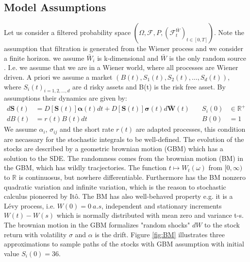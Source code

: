 \subsection{Model Assumptions}
Let us consider a filtered probability space $(\Omega, \mathcal{F}, P, (\mathcal{F}_t^{\bar{W}})_{t \in [0,T]})$. Note the assumption that filtration is generated from the Wiener process and we consider a finite horizon. we assume $\bar{W}_i$ is k-dimensional and $\bar{W}$ is the only random source . I.e. we assume that we are in a Wiener world, where all processes are Wiener driven. A priori we assume a market $(B(t),S_1(t), S_2(t),\ldots, S_d(t))$, where ${S_i(t)}_{i=1,2,\ldots,d}$ are d risky assets and B(t) is the risk free asset. By assumptions their dynamics are given by:\\
\begin{align}
d\bm{S}(t)&=D[\bm{S}(t)]\bm{\alpha}(t)dt+D[\bm{S}(t)]\bm{\sigma}(t)d\bar{\bm{W}}(t) \quad & S_i(0) &\in \mathbb{R}^+ \label{GBM-P} \\
dB(t)&=r(t)B(t)dt \quad & B(0) &= 1
\end{align}
We assume $\alpha_i$, $\sigma_{ij}$ and the short rate $r(t)$ are adapted processes, this condition are necassary for the stochastic integrals to be well-defined. The evolution of the stocks are described by a geometric brownian motion (GBM) which has a solution to the SDE. The randomness comes from the brownian motion (BM) in the GBM, which has wildly tracjectories. The function $t\mapsto W_{t}(\omega)$ from $[0,\infty)$ to $\mathbb{R}$ is continuosus, but nowhere differentiable. Furthermore has the BM nonzero quadratic variation and infinite variation, which is the reason to stochastic calculus pioneered by Itô. The BM has also well-behaved property e.g. it is a Lévy process, i.e. $W(0)=0 \ a.s$, independent and stationary increments $W(t)-W(s)$ which is normally distributed with mean zero and variance t-s. The brownian motion in the GBM formalizes "random shocks" $dW$ to the stock return with volatility $\sigma$ and $\alpha$ is the drift. Figure \ref{fig:BM} illustrates three approximations to sample paths of the stocks with GBM assumption with initial value $S_{i}(0)=36$.

